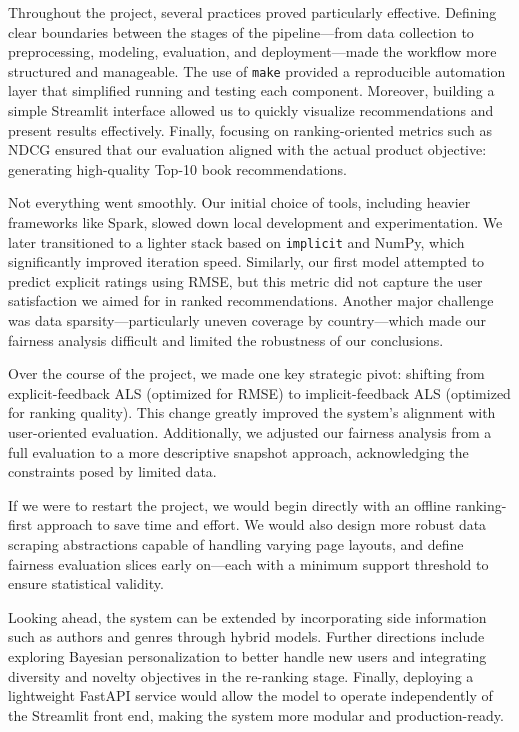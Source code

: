 \documentclass[11pt,a4paper]{article}
\begin{document}
Throughout the project, several practices proved particularly effective. Defining clear boundaries between the stages of the pipeline—from data collection to preprocessing, modeling, evaluation, and deployment—made the workflow more structured and manageable. The use of \texttt{make} provided a reproducible automation layer that simplified running and testing each component. Moreover, building a simple Streamlit interface allowed us to quickly visualize recommendations and present results effectively. Finally, focusing on ranking-oriented metrics such as NDCG ensured that our evaluation aligned with the actual product objective: generating high-quality Top-10 book recommendations.

Not everything went smoothly. Our initial choice of tools, including heavier frameworks like Spark, slowed down local development and experimentation. We later transitioned to a lighter stack based on \texttt{implicit} and NumPy, which significantly improved iteration speed. Similarly, our first model attempted to predict explicit ratings using RMSE, but this metric did not capture the user satisfaction we aimed for in ranked recommendations. Another major challenge was data sparsity—particularly uneven coverage by country—which made our fairness analysis difficult and limited the robustness of our conclusions.

Over the course of the project, we made one key strategic pivot: shifting from explicit-feedback ALS (optimized for RMSE) to implicit-feedback ALS (optimized for ranking quality). This change greatly improved the system’s alignment with user-oriented evaluation. Additionally, we adjusted our fairness analysis from a full evaluation to a more descriptive snapshot approach, acknowledging the constraints posed by limited data.

If we were to restart the project, we would begin directly with an offline ranking-first approach to save time and effort. We would also design more robust data scraping abstractions capable of handling varying page layouts, and define fairness evaluation slices early on—each with a minimum support threshold to ensure statistical validity.

Looking ahead, the system can be extended by incorporating side information such as authors and genres through hybrid models. Further directions include exploring Bayesian personalization to better handle new users and integrating diversity and novelty objectives in the re-ranking stage. Finally, deploying a lightweight FastAPI service would allow the model to operate independently of the Streamlit front end, making the system more modular and production-ready.
\end{document}
